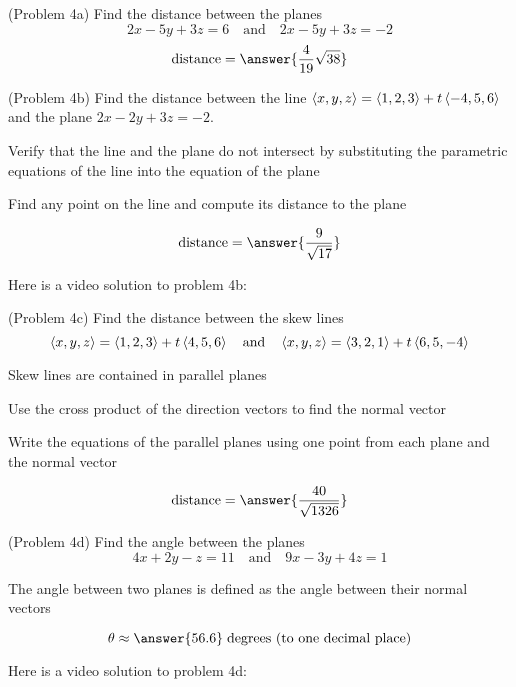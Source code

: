 \documentclass[handout]{ximera}
\begin{document}
\begin{problem}(Problem 4a)
Find the distance between the planes 
\[
2x -5y + 3z = 6 \quad \text{and} \quad 2x-5y+3z = -2
\]
\[
    \text{distance} = \answer{\frac{4}{19}\sqrt{38}}
\]
\end{problem}

\begin{problem}(Problem 4b)
Find the distance between the line $\left\langle x, y, z\right\rangle = \left\langle 1, 2, 3\right\rangle + t\left\langle -4, 5, 6\right\rangle$ and the plane $2x-2y+3z = -2$.\\
\begin{hint}
Verify that the line and the plane do not intersect by substituting the parametric equations 
of the line into the equation of the plane
\end{hint}
\begin{hint}
Find any point on the line and compute its distance to the plane
\end{hint}
\[
   \text{distance} = \answer{\frac{9}{\sqrt{17}}}
\]
\end{problem}

Here is a video solution to problem 4b:\\
\begin{foldable}
\end{foldable}

\begin{problem}(Problem 4c)
Find the distance between the skew lines 
\[
    \left\langle x, y, z\right\rangle = \left\langle 1, 2, 3\right\rangle + t\left\langle 4, 5, 6\right\rangle\quad \text{and} \quad \left\langle x, y, z\right\rangle = \left\langle 3, 2, 1\right\rangle + t\left\langle 6, 5, -4\right\rangle
\]
\begin{hint}
Skew lines are contained in parallel planes
\end{hint}
\begin{hint}
Use the cross product of the direction vectors to find the normal vector
\end{hint}
\begin{hint}
Write the equations of the parallel planes using one point from each plane and the normal vector
\end{hint}
\[
   \text{distance} = \answer{\frac{40}{\sqrt{1326}}}
\]
\end{problem}

\begin{problem}(Problem 4d)
Find the angle between the planes
\[
4x + 2y - z = 11 \quad \text{and} \quad 9x - 3y + 4z = 1
\]
\begin{hint}
The angle between two planes is defined as the angle between their normal vectors
\end{hint}
\[
\theta \approx \answer{56.6} \; \text{degrees (to one decimal place)}
\]
\end{problem}

Here is a video solution to problem 4d:\\
\begin{foldable}
\end{foldable}
\end{document}
